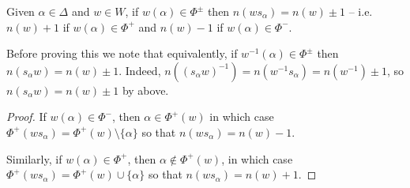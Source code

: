 \begin{proposition} \label{9.1}
Given $\alpha \in \Delta$ and $w \in W$, if $w(\alpha) \in \Phi^{\pm}$ then
$n(w s_\alpha) = n(w) \pm 1$ -- i.e. $n(w) + 1$ if $w(\alpha) \in \Phi^+$ and
$n(w) - 1$ if $w(\alpha) \in \Phi^-$.
\end{proposition}

Before proving this we note that equivalently, if $w^{-1}(\alpha) \in \Phi^\pm$
then $n(s_\alpha w) = n(w) \pm 1$. Indeed, $n((s_\alpha w)^{-1}) =
n(w^{-1} s_\alpha) = n(w^{-1}) \pm 1$, so $n(s_\alpha w) = n(w) \pm 1$ by above.

\begin{proof}
If $w(\alpha) \in \Phi^-$, then $\alpha \in \Phi^+(w)$ in which case
$\Phi^+(w s_\alpha) = \Phi^+(w) \setminus \{\alpha\}$ so that
$n(w s_\alpha) = n(w) - 1$.

Similarly, if $w(\alpha) \in \Phi^+$, then $\alpha \not\in \Phi^+(w)$, in which
case $\Phi^+(w s_\alpha) = \Phi^+(w) \cup \{\alpha\}$ so that
$n(w s_\alpha) = n(w) + 1$.
\end{proof}
